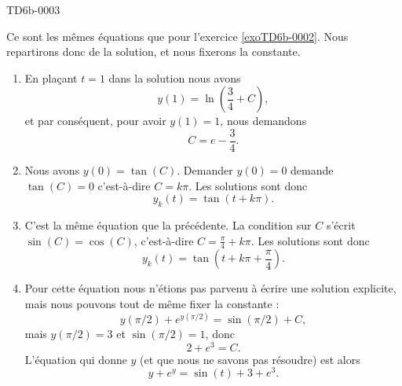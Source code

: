 
\begin{corrige}{TD6b-0003}

    Ce sont les mêmes équations que pour l'exercice \ref{exoTD6b-0002}. Nous repartirons donc de la solution, et nous fixerons la constante.

    \begin{enumerate}
            

    \item

        En plaçant \( t=1\) dans la solution nous avons
        \begin{equation}
            y(1)=\ln\left( \frac{ 3 }{ 4 }+C \right),
        \end{equation}
        et par conséquent, pour avoir \( y(1)=1\), nous demandons
        \begin{equation}
            C=e-\frac{ 3 }{ 4 }.
        \end{equation}
        
    \item

        Nous avons \( y(0)=\tan(C)\). Demander \( y(0)=0\) demande \( \tan(C)=0\) c'est-à-dire \( C=k\pi\). Les solutions sont donc
        \begin{equation}
            y_k(t)=\tan(t+k\pi).
        \end{equation}
    \item
        C'est la même équation que la précédente. La condition sur \( C\) s'écrit \( \sin(C)=\cos(C)\), c'est-à-dire \( C=\frac{ \pi }{ 4 }+k\pi\). Les solutions sont donc
        \begin{equation}
            y_k(t)=\tan(t+k\pi+\frac{ \pi }{ 4 }).
        \end{equation}

    \item

        Pour cette équation nous n'étions pas parvenu à écrire une solution explicite, mais nous pouvons tout de même fixer la constante :
        \begin{equation}
            y(\pi/2)+ e^{y(\pi/2)}=\sin(\pi/2)+C,
        \end{equation}
        mais \( y(\pi/2)=3\) et \( \sin(\pi/2)=1\), donc
        \begin{equation}
            2+ e^{3}=C.
        \end{equation}
        L'équation qui donne \( y\) (et que nous ne savons pas résoudre) est alors
        \begin{equation}
            y+ e^{y}=\sin(t)+3+e^3.
        \end{equation}
        

\end{enumerate}
\end{corrige}
